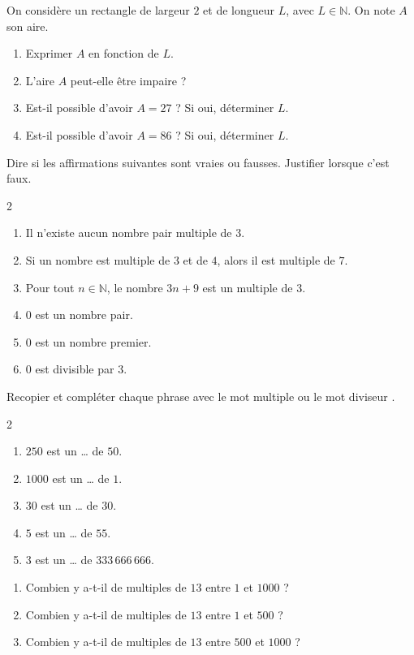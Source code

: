 \exo

On considère un rectangle de largeur $2$ et de longueur $L$, avec $L\in\mathbb{N}$.
On note $A$ son aire.
\begin{enumerate}
\item Exprimer $A$ en fonction de $L$.
\item L'aire $A$ peut-elle être impaire ?
\item Est-il possible d'avoir $A=27$ ? Si oui, déterminer $L$.
\item Est-il possible d'avoir $A=86$ ? Si oui, déterminer $L$.
\end{enumerate}

\exo

Dire si les affirmations suivantes sont vraies ou fausses. Justifier lorsque c'est faux.
\setlength{\columnseprule}{0pt}
\begin{multicols}{2}
\begin{enumerate}
\item Il n'existe aucun nombre pair multiple de $3$.
\item Si un nombre est multiple de $3$ et de $4$, alors il est multiple de $7$.
\item Pour tout $n\in\mathbb{N}$, le nombre $3n+9$ est un multiple de $3$.
\item $0$ est un nombre pair.
\item $0$ est un nombre premier.
\item $0$ est divisible par $3$.
\end{enumerate}
\end{multicols}

\exo

Recopier et compléter chaque phrase avec le mot \og multiple \fg{} ou le mot \og diviseur \fg{}.
\setlength{\columnseprule}{0pt}
\begin{multicols}{2}
\begin{enumerate}
\item $250$ est un \ldots{} de $50$.
\item $1000$ est un \ldots{} de $1$.
\item $30$ est un \ldots{} de $30$.
\item $5$ est un \ldots{} de $55$.
\item $3$ est un \ldots{} de $333\,666\,666$.
\end{enumerate}
\end{multicols}

\exo

\begin{enumerate}
\item Combien y a-t-il de multiples de $13$ entre $1$ et $1000$ ?
\item Combien y a-t-il de multiples de $13$ entre $1$ et $500$ ?
\item Combien y a-t-il de multiples de $13$ entre $500$ et $1000$ ?
\end{enumerate}

